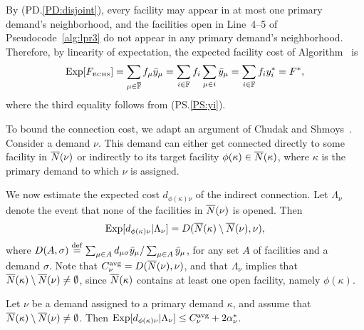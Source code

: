 \documentclass{llncs}
\begin{document}
By (PD.\ref{PD:disjoint}), every facility may appear in at most one
primary demand's neighborhood, and the facilities open in Line~4--5 of
Pseudocode~\ref{alg:lpr3} do not appear in any primary demand's
neighborhood. Therefore, by linearity of expectation, the expected
facility cost of Algorithm~{\ECHS} is
%
\begin{equation*}
\mbox{\rm Exp}[F_{\mbox{\tiny\rm ECHS}}] 
	= \sum_{\mu\in\overline{\mathbb{F}}} f_\mu {\bar y}_{\mu} 
	= \sum_{i\in\mathbb{F}} f_i\sum_{\mu\in i} {\bar y}_{\mu} 
	= \sum_{i\in\mathbb{F}} f_i y_i^\ast = F^\ast,
\end{equation*}
%
where the third equality follows from (PS.\ref{PS:yi}).

\smallskip

To bound the connection cost, we adapt an argument of Chudak
and Shmoys~\cite{ChudakS04}. Consider a demand $\nu$. This
demand can either get connected directly to some facility in
${\overline{N}}(\nu)$ or indirectly to its target facility $\phi(\kappa)\in
{\overline{N}}(\kappa)$, where $\kappa$ is the primary demand to
which $\nu$ is assigned.

We now estimate the expected cost $d_{\phi(\kappa)\nu}$ of the indirect
connection. Let $\Lambda_\nu$ denote the event that none of the
facilities in ${\overline{N}}(\nu)$ is opened. Then
%
\begin{equation*}
	\mbox{\rm Exp}[ d_{\phi(\kappa)\nu} | \Lambda_\nu] 
			= D({\overline{N}}(\kappa) \setminus {\overline{N}}(\nu), \nu),
\end{equation*}
%
where $D(A,\sigma) \stackrel{\mathrm{def}}{=}\sum_{\mu\in A}
d_{\mu\sigma}{\bar y}_{\mu}/\sum_{\mu\in A} {\bar y}_{\mu}$, for
any set $A$ of facilities and a demand $\sigma$.
Note that $C^{{\mbox{\scriptsize\rm avg}}}_\nu = D({\overline{N}}(\nu),\nu)$,
and that $\Lambda_\nu$ implies that ${\overline{N}}(\kappa) \setminus {\overline{N}}(\nu)\neq\emptyset$,
since ${\overline{N}}(\kappa)$ contains at least one open facility, namely $\phi(\kappa)$.


\begin{lemma}
  \label{lem:echu indirect}
  Let $\nu$ be a demand assigned to a primary demand $\kappa$, and
assume that ${\overline{N}}(\kappa) \setminus {\overline{N}}(\nu)\neq\emptyset$.
Then $\mbox{\rm Exp}[ d_{\phi(\kappa)\nu} | \Lambda_\nu]  \leq
  		C^{{\mbox{\scriptsize\rm avg}}}_\nu+2\alpha_{\nu}^\ast$.
\end{lemma}
\end{document}
